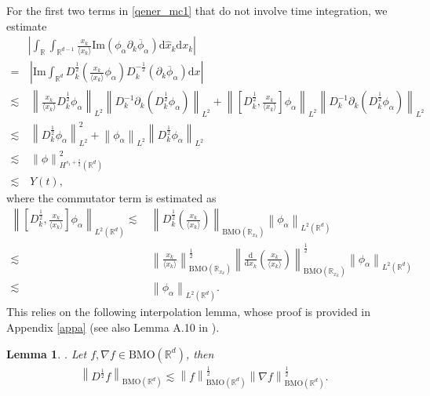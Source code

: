 \documentclass[10pt,twoside,a4paper]{article}
\newtheorem{lem}[thm]{Lemma}
\numberwithin{equation}{section}\allowdisplaybreaks
\begin{document}
For the first two terms  in \eqref{qener_mc1} that do not involve time integration,  we estimate
\begin{align}  \label{qener_mc4}
	&\left|\int_{\mathbb{R}}  \int_{\mathbb{R}^{d-1}}  \frac{x_k}{\langle x_k\rangle}  \mathrm{Im}\left( \phi_{\alpha } \partial_k \overline{\phi}_\alpha \right) \mathrm{d} \hat{x}_k \mathrm{d} x_k\right| \nonumber\\
	=&\,\left|\mathrm{Im}\int_{\mathbb{R}^d}   D_k^{\frac 12}\left( \frac{x_k}{\langle x_k\rangle}    \phi_{\alpha } \right)D_k^{-\frac 12}\left(\partial_k \overline{\phi}_\alpha \right) \mathrm{d} x\right| \\
	\lesssim &\,\left\|  \frac{x_k}{\langle x_k\rangle}   D_k^{\frac 12}    \phi_\alpha \right\|_{L^2} \left\|   D_k^{-1} \partial_k \left(D_k^{\frac 12}\phi_{\alpha}\right)\right\|_{L^2}  + \left\|  \left[D_k^{\frac 12},\frac{x_k}{\langle x_k\rangle}   \right]   \phi_\alpha \right\|_{L^2} \left\|   D_k^{-1} \partial_k \left(D_k^{\frac 12}\phi_{\alpha}\right)\right\|_{L^2} \nonumber\\
	\lesssim &\, \left\|   D_k^{\frac 12}\phi_{\alpha}\right\|_{L^2}^2+  \left\|   \phi_{\alpha}\right\|_{L^2}\left\|   D_k^{\frac 12}\phi_{\alpha}\right\|_{L^2}\nonumber\\
	\lesssim &\, \left\|\phi\right\|_{H^{s_1+\frac 12}(\mathbb{R}^d)}^2\nonumber\\ \lesssim&\, Y(t), \nonumber
\end{align}
where the commutator term is estimated as
\begin{align} \label{comxk}
	\left\|  \left[D_k^{\frac 12},\frac{x_k}{\langle x_k\rangle}   \right]   \phi_\alpha \right\|_{L^2(\mathbb{R}^d)} \lesssim &\, \left\|  D_k^{\frac 12}\left(\frac{x_k}{\langle x_k\rangle}  \right)  \right\|_{\mathrm{BMO}(\mathbb{R}_{x_k})}  \left\|     \phi_\alpha \right\|_{L^2(\mathbb{R}^d)} \\
	\lesssim &\,\left\|  \frac{x_k}{\langle x_k\rangle}   \right\|_{\mathrm{BMO}(\mathbb{R}_{x_k})}^{\frac 12 }  \left\| \frac{\mathrm{d}}{\mathrm{d} x_k}\left( \frac{x_k}{\langle x_k\rangle}  \right) \right\|_{\mathrm{BMO}(\mathbb{R}_{x_k})}^{\frac 12 }  \left\|     \phi_\alpha \right\|_{L^2(\mathbb{R}^d)} \nonumber\\
	\lesssim &\, \left\|     \phi_\alpha \right\|_{L^2(\mathbb{R}^d)}.  \nonumber
\end{align}
This relies on the following interpolation lemma, whose proof is provided in Appendix \ref{appa} (see also Lemma A.10 in \cite{tao2006nonlinear}).
\begin{lem} \label{leminter1}.
	Let $ f, \nabla f \in \mathrm{BMO}(\mathbb{R}^d ) $, then
	\begin{align*} 
		\left\| D^{\frac12} f \right\|_{\mathrm{BMO}(\mathbb{R}^d)} \lesssim 	\left\|   f \right\|_{\mathrm{BMO}(\mathbb{R}^d)}^{\frac 12 }  	\left\| \nabla f \right\|_{\mathrm{BMO}(\mathbb{R}^d)} ^{\frac 12 }.
	\end{align*}
\end{lem}
\end{document}
